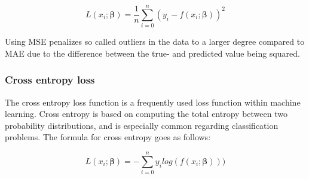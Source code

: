 \documentclass[../main.tex]{subfiles}
\begin{document}
\begin{equation*}
    L(x_i; \boldsymbol{\beta})=\frac{1}{n}\sum_{i=0}^n(y_i-f(x_i; \boldsymbol{\beta}))^2
\end{equation*}

Using MSE penalizes so called outliers in the data to a larger degree compared to MAE due to the difference between the true- and predicted value being squared.

\subsubsection{Cross entropy loss}
The cross entropy loss function is a frequently used loss function within machine learning. Cross entropy is based on computing the total entropy between two probability distributions, and is especially common regarding classification problems. The formula for cross entropy goes as follows:

\begin{equation*}
    L(x_i; \boldsymbol{\beta})=-\sum_{i=0}^{n}y_i log(f(x_i; \boldsymbol{\beta})))
\end{equation*}
\end{document}

